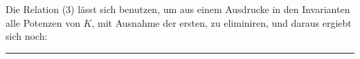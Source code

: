 
Die Relation (3) l\"asst sich benutzen, um aus einem Ausdrucke in den Invarianten alle Potenzen von $K$, mit Ausnahme der ersten, zu eliminiren, und daraus ergiebt sich noch:

\begin{quote}
\end{quote}

\begin{center}
\rule{4cm}{0.4pt}
\end{center}
